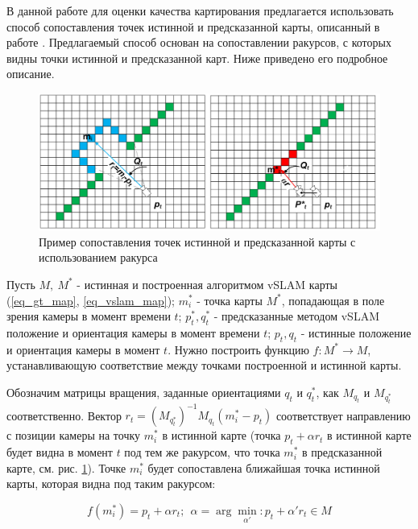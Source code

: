 \documentclass{mipt-thesis-ms}
\begin{document}
	В данной работе для оценки качества картирования предлагается использовать способ сопоставления точек истинной и предсказанной карты, описанный в работе \cite{bokovoy2021assessment}. Предлагаемый способ основан на сопоставлении ракурсов, с которых видны точки истинной и предсказанной карт. Ниже приведено его подробное описание.
	
	\begin{figure}
		\includegraphics[width=1.0\textwidth]{img/corresp.png}
		\caption{Пример сопоставления точек истинной и предсказанной карты с использованием ракурса}
		\label{figure_correspondences}
	\end{figure}
	
	Пусть $M,\ M^*$ - истинная и построенная алгоритмом vSLAM карты (\ref{eq_gt_map}, \ref{eq_vslam_map}); $m_i^*$ - точка карты $M^*$, попадающая в поле зрения камеры в момент времени $t$; $p_t^*, q_t^*$ - предсказанные методом vSLAM положение и ориентация камеры в момент времени $t$; $p_t, q_t$ - истинные положение и ориентация камеры в момент $t$. Нужно построить функцию $f: M^* \longrightarrow M$, устанавливающую соответствие между точками построенной и истинной карты.
	
	Обозначим матрицы вращения, заданные ориентациями $q_t$ и $q_t^*$, как $M_{q_t}$ и $M_{q_t^*}$ соответственно. Вектор $r_t = (M_{q_t^*})^{-1} M_{q_t} (m_i^* - p_t)$ соответствует направлению с позиции камеры на точку $m_i^*$ в истинной карте (точка $p_t + \alpha r_t$ в истинной карте будет видна в момент $t$ под тем же ракурсом, что точка $m_i^*$ в предсказанной карте, см. рис. \ref{figure_correspondences}). Точке $m_i^*$ будет сопоставлена ближайшая точка истинной карты, которая видна под таким ракурсом:
	
	\begin{equation}
	\label{eq_corresp_function}
	f(m_i^*) = p_t + \alpha r_t;\ \ \alpha = \arg\min \limits_{\alpha'}: p_t + \alpha' r_t \in M
	\end{equation}
	
\end{document}
